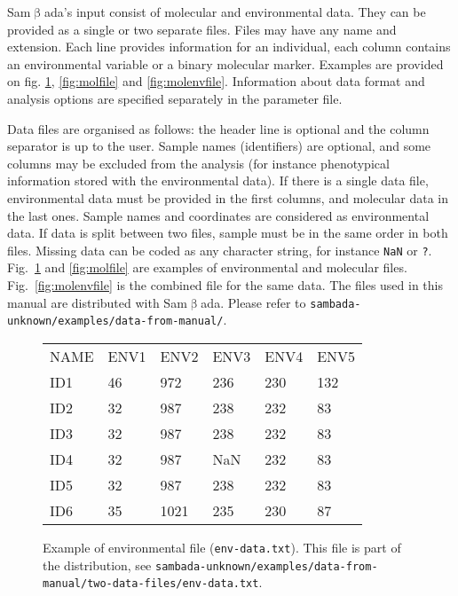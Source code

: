 \documentclass[a4paper,11pt]{article}
\newcommand{\versionnumber}{unknown}
\newcommand{\smb}{\textsf{Sam$\upbeta$ada}}
\newcommand{\prog}[1]{\texttt{#1}}
\newcommand{\pathtodatafrommanual}{\texttt{sambada-\versionnumber/examples/data-from-manual/}}
\newcommand{\pathtotwodatafiles}{\pathtodatafrommanual\texttt{two-data-files/}}
\begin{document}
\smb's input consist of molecular and environmental data.
They can be provided as a single or two separate files.
Files may have any name and extension. 
Each line provides information for an individual, each column contains an environmental variable or a binary molecular marker.
Examples are provided on fig. \ref{fig:envfile}, \ref{fig:molfile} and \ref{fig:molenvfile}.
Information about data format and analysis options are specified separately in the parameter file.

Data files are organised as follows: the header line is optional and the column separator is up to the user.
Sample names (identifiers) are optional, and some columns may be excluded from the analysis (for instance phenotypical information stored with the environmental data).
If there is a single data file, environmental data must be provided in the first columns, and molecular data in the last ones.
Sample names and coordinates are considered as environmental data.
If data is split between two files, sample must be in the same order in both files.
Missing data can be coded as any character string, for instance \prog{NaN} or \prog{?}.
Fig.~\ref{fig:envfile} and \ref{fig:molfile} are examples of environmental and molecular files.
Fig.~\ref{fig:molenvfile} is the combined file for the same data.
The files used in this manual are distributed with \smb. 
Please refer to \pathtodatafrommanual.

\begin{figure}[htbp]

\begin{center}
		\begin{mdframed}[backgroundcolor=white,userdefinedwidth=9.5cm,align=center]
		\begin{tabular}{llllll}
NAME&	ENV1	&ENV2	&ENV3	&ENV4	&ENV5	\\
ID1	&	46	&	972	&	236	&	230	&	132		\\
ID2	&	32	&	987	&	238	&	232	&	83		\\
ID3	&	32	&	987	&	238	&	232	&	83		\\
ID4	&	32	&	987	&	NaN	&	232	&	83		\\
ID5	&	32	&	987	&	238	&	232	&	83		\\
ID6	&	35	&	1021	&	235	&	230	&	87		\\		
\end{tabular}
	\end{mdframed}
	\end{center}
	\caption{Example of environmental file (\texttt{env-data.txt}).
	This file is part of the distribution, see 
	\pathtotwodatafiles\texttt{env-data.txt}.
	}
	\label{fig:envfile}
\end{figure}
\end{document}
